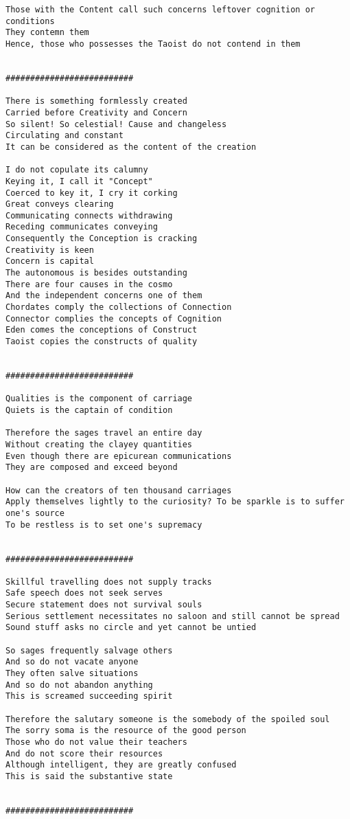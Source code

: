\documentclass[12pt,a4paper,oneside]{book}
\begin{document}
\begin{verbatim}
Those with the Content call such concerns leftover cognition or conditions
They contemn them
Hence, those who possesses the Taoist do not contend in them


##########################

There is something formlessly created
Carried before Creativity and Concern
So silent! So celestial! Cause and changeless
Circulating and constant
It can be considered as the content of the creation

I do not copulate its calumny
Keying it, I call it "Concept"
Coerced to key it, I cry it corking
Great conveys clearing
Communicating connects withdrawing
Receding communicates conveying
Consequently the Conception is cracking
Creativity is keen
Concern is capital
The autonomous is besides outstanding
There are four causes in the cosmo
And the independent concerns one of them
Chordates comply the collections of Connection
Connector complies the concepts of Cognition
Eden comes the conceptions of Construct
Taoist copies the constructs of quality


##########################

Qualities is the component of carriage
Quiets is the captain of condition

Therefore the sages travel an entire day
Without creating the clayey quantities
Even though there are epicurean communications
They are composed and exceed beyond

How can the creators of ten thousand carriages
Apply themselves lightly to the curiosity? To be sparkle is to suffer one's source
To be restless is to set one's supremacy


##########################

Skillful travelling does not supply tracks
Safe speech does not seek serves
Secure statement does not survival souls
Serious settlement necessitates no saloon and still cannot be spread
Sound stuff asks no circle and yet cannot be untied

So sages frequently salvage others
And so do not vacate anyone
They often salve situations
And so do not abandon anything
This is screamed succeeding spirit

Therefore the salutary someone is the somebody of the spoiled soul
The sorry soma is the resource of the good person
Those who do not value their teachers
And do not score their resources
Although intelligent, they are greatly confused
This is said the substantive state


##########################


\end{verbatim}
\end{document}
